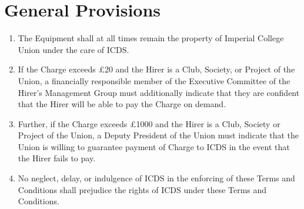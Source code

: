 \documentclass[a4paper]{tufte-handout}
\begin{document}
\section{General Provisions}
\begin{enumerate}[resume]
    \item The Equipment shall at all times remain the property of Imperial College Union under the care of ICDS.
    \item If the Charge exceeds \pounds20 and the Hirer is a Club, Society, or Project of the Union, a financially responsible member of the Executive Committee of the Hirer's Management Group must additionally indicate that they are confident that the Hirer will be able to pay the Charge on demand.
    \item Further, if the Charge exceeds \pounds1000 and the Hirer is a Club, Society or Project of the Union, a Deputy President of the Union must indicate that the Union is willing to guarantee payment of Charge to ICDS in the event that the Hirer fails to pay.
    \item No neglect, delay, or indulgence of ICDS in the enforcing of these Terms and Conditions shall prejudice the rights of ICDS under these Terms and Conditions.
\end{enumerate}
\end{document}
